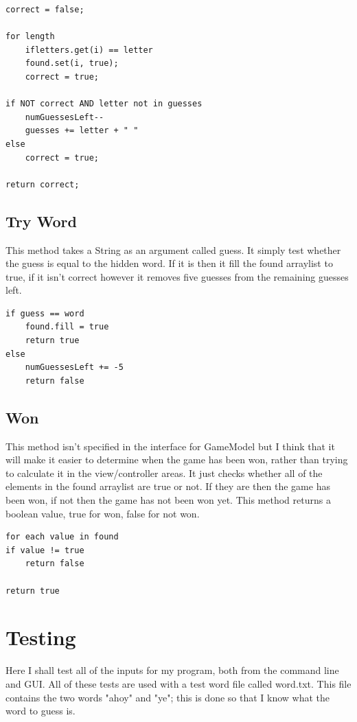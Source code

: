 \documentclass[notitlepage]{report}
\begin{document}
\begin{lstlisting}
correct = false;

for length
    ifletters.get(i) == letter
    found.set(i, true);
    correct = true;

if NOT correct AND letter not in guesses
    numGuessesLeft--
    guesses += letter + " "
else
    correct = true;

return correct;
\end{lstlisting}

\subsection{Try Word}
This method takes a String as an argument called guess. It simply test whether the guess is equal to the hidden word. If it is then it fill the found arraylist to true, if it isn't correct however it removes five guesses from the remaining guesses left. 

\begin{lstlisting}
if guess == word
    found.fill = true
    return true
else    
    numGuessesLeft += -5
    return false
\end{lstlisting}

\subsection{Won}
This method isn't specified in the interface for GameModel but I think that it will make it easier to determine when the game has been won, rather than trying to calculate it in the view/controller areas. It just checks whether all of the elements in the found arraylist are true or not. If they are then the game has been won, if not then the game has not been won yet. This method returns a boolean value, true for won, false for not won.

\begin{lstlisting}
for each value in found
if value != true
    return false

return true
\end{lstlisting}

\section{Testing}
Here I shall test all of the inputs for my program, both from the command line and GUI. All of these tests are used with a test word file called word.txt. This file contains the two words "ahoy" and "ye"; this is done so that I know what the word to guess is.
\end{document}
